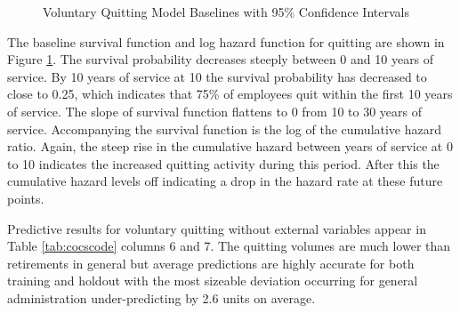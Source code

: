 \begin{figure}[h!]
	\centering
	\caption{Voluntary Quitting Model Baselines with 95\% Confidence Intervals}
	\label{fig:vqbasepred}
\end{figure}
The baseline survival function and log hazard function for quitting are shown in Figure \ref{fig:vqbasepred}. The survival probability decreases steeply between 0 and 10 years of service. By 10 years of service at 10 the survival probability has decreased to close to 0.25, which indicates that 75\% of employees quit within the first 10 years of service. The slope of survival function flattens to 0 from 10 to 30 years of service.  Accompanying the survival function is the log of the cumulative hazard ratio.  Again, the steep rise in the cumulative hazard between years of service at 0 to 10 indicates the increased quitting activity during this period.  After this the cumulative hazard levels off indicating a drop in the hazard rate at these future points.

Predictive results for voluntary quitting without external variables appear in Table \ref{tab:cocscode} columns 6 and 7. The quitting volumes are much lower than retirements in general but average predictions are highly accurate for both training and holdout with the most sizeable deviation occurring for general administration under-predicting by 2.6 units on average.

